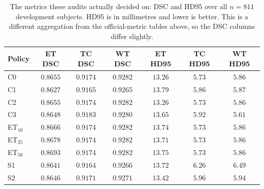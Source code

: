 \documentclass[runningheads]{llncs}
\begin{document}
\begin{table}[!htbp]\centering\small
\caption{The metrics these audits actually decided on: DSC and HD95 over all $n=811$ development subjects. HD95 is in millimetres and lower is better. This is a different aggregation from the official-metric tables above, so the DSC columns differ slightly.}
\begin{tabular}{@{}lcccccc@{}}
\toprule
Policy & ET DSC & TC DSC & WT DSC & ET HD95 & TC HD95 & WT HD95 \\
\midrule
C0 & $0.8655$ & $0.9174$ & $0.9282$ & $13.26$ & $5.73$ & $5.86$ \\
\midrule
C1 & $0.8627$ & $0.9165$ & $0.9265$ & $13.79$ & $5.86$ & $5.87$ \\
C2 & $0.8655$ & $0.9174$ & $0.9282$ & $13.26$ & $5.73$ & $5.86$ \\
C3 & $0.8648$ & $0.9183$ & $0.9280$ & $13.65$ & $5.92$ & $5.61$ \\
ET$_{10}$ & $0.8666$ & $0.9174$ & $0.9282$ & $13.74$ & $5.73$ & $5.86$ \\
ET$_{25}$ & $0.8678$ & $0.9174$ & $0.9282$ & $13.71$ & $5.73$ & $5.86$ \\
ET$_{50}$ & $0.8693$ & $0.9174$ & $0.9282$ & $13.75$ & $5.73$ & $5.86$ \\
S1 & $0.8641$ & $0.9164$ & $0.9266$ & $13.72$ & $6.26$ & $6.49$ \\
S2 & $0.8646$ & $0.9171$ & $0.9271$ & $13.42$ & $5.96$ & $5.94$ \\
\bottomrule
\end{tabular}
\end{table}
\end{document}
